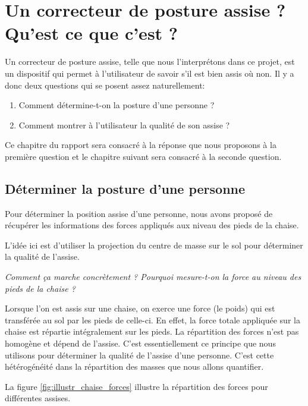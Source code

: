 \documentclass{polytech/polytech}
\begin{document}
\chapter{Un correcteur de posture assise ? Qu'est ce que c'est ?}
\label{chap:correcteur posture}

Un correcteur de posture assise, telle que nous l'interprétons dans ce projet, est un dispositif qui permet à l'utilisateur de savoir s'il est bien assis où non. Il y a donc deux questions qui se posent assez naturellement:

\begin{enumerate}
\item Comment détermine-t-on la posture d'une personne ?
\item Comment montrer à l'utilisateur la qualité de son assise ?
\end{enumerate}

Ce chapitre du rapport sera consacré à la réponse que nous proposons à la première question et le chapitre suivant sera consacré à la seconde question.

\section{Déterminer la posture d'une personne}
\label{chap:posture_determination}

Pour déterminer la position assise d'une personne, nous avons proposé de récupérer les informations des forces appliqués aux niveau des pieds de la chaise. 

L'idée ici est d'utiliser la projection du centre de masse sur le sol pour déterminer la qualité de l'assise. 

\begin{center}
\textit{Comment ça marche concrètement ? Pourquoi mesure-t-on la force au niveau des pieds de la chaise ?} 
\end{center}

Lorsque l'on est assis sur une chaise, on exerce une force (le poids) qui est transférée au sol par les pieds de celle-ci. En effet, la force totale appliquée sur la chaise est répartie intégralement sur les pieds.
La répartition des forces n'est pas homogène et dépend de l'assise. C'est essentiellement ce principe que nous utilisons pour déterminer la qualité de l'assise d'une personne. C'est cette hétérogénéité dans la répartition des masses que nous allons quantifier.

La figure \ref{fig:illustr_chaise_forces}  illustre la répartition des forces pour différentes assises.
\end{document}
